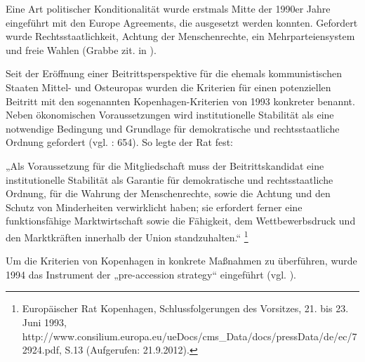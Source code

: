Eine Art politischer Konditionalität wurde erstmals Mitte der 1990er Jahre eingeführt mit den Europe Agreements, die ausgesetzt werden konnten. Gefordert wurde Rechtsstaatlichkeit, Achtung der Menschenrechte, ein Mehrparteiensystem und freie Wahlen (Grabbe zit. in \cite{pridham07}).\par
Seit der Eröffnung einer Beitrittsperspektive für die ehemals kommunistischen Staaten Mittel- und Osteuropas wurden die Kriterien für einen potenziellen Beitritt mit den sogenannten Kopenhagen-Kriterien von 1993 konkreter benannt. Neben ökonomischen Voraussetzungen wird institutionelle Stabilität als eine notwendige Bedingung und Grundlage für demokratische und rechtsstaatliche Ordnung gefordert (vgl. \cite{kreile} : 654). So legte der Rat fest:\par

„Als Voraussetzung für die Mitgliedschaft muss der Beitrittskandidat eine institutionelle Stabilität als Garantie für demokratische und rechtsstaatliche Ordnung, für die Wahrung der Menschenrechte, sowie die Achtung und den Schutz von Minderheiten verwirklicht haben; sie erfordert ferner eine funktionsfähige Marktwirtschaft sowie die Fähigkeit, dem Wettbewerbsdruck und den Marktkräften innerhalb der Union standzuhalten.“ \footnote{Europäischer Rat Kopenhagen, Schlussfolgerungen des Vorsitzes, 21. bis 23. Juni 1993, http://www.consilium.europa.eu/ueDocs/cms\_Data/docs/pressData/de/ec/72924.pdf, S.13 (Aufgerufen: 21.9.2012).}\par

Um die Kriterien von Kopenhagen in konkrete Maßnahmen zu überführen, wurde 1994 das Instrument der „pre-accession strategy“ eingeführt (vgl. \cite{lipsch}). \par

